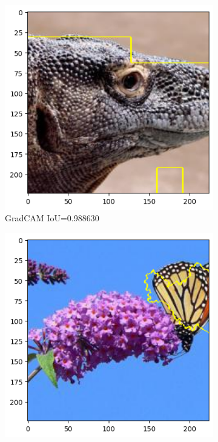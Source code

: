 \begin{figure}[h]
	\centering
	\begin{subfigure}[b]{0.3\textwidth}
		\includegraphics[width=.9\textwidth]{img/examples/appendix/n01695060_35102_gradcam}
		\caption{GradCAM IoU=0.988630}
	\end{subfigure}
	\begin{subfigure}[b]{0.3\textwidth}
		\includegraphics[width=.9\textwidth]{img/examples/appendix/n02279972_47456_lime}

\end{subfigure}
\end{figure}
